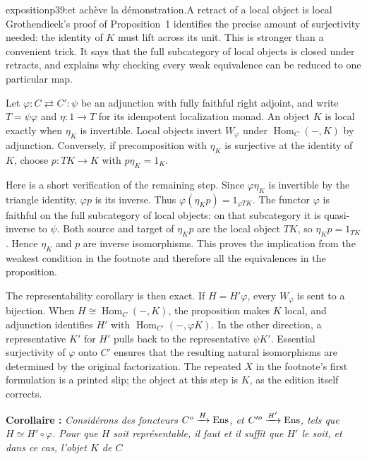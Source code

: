 \begin{dcomment}{exposition}{p39:et achève la démonstration.}{A retract of a local object is local}
Grothendieck's proof of Proposition~1 identifies the precise amount of surjectivity needed: the identity of $K$ must lift across its unit. This is stronger than a convenient trick. It says that the full subcategory of local objects is closed under retracts, and explains why checking every weak equivalence can be reduced to one particular map.

Let $\varphi:C\rightleftarrows C':\psi$ be an adjunction with fully faithful right adjoint, and write $T=\psi\varphi$ and $\eta:1\to T$ for its idempotent localization monad. An object $K$ is local exactly when $\eta_K$ is invertible. Local objects invert $W_\varphi$ under $\operatorname{Hom}_C(-,K)$ by adjunction. Conversely, if precomposition with $\eta_K$ is surjective at the identity of $K$, choose $p:TK\to K$ with $p\eta_K=1_K$.

Here is a short verification of the remaining step. Since $\varphi\eta_K$ is invertible by the triangle identity, $\varphi p$ is its inverse. Thus $\varphi(\eta_Kp)=1_{\varphi TK}$. The functor $\varphi$ is faithful on the full subcategory of local objects: on that subcategory it is quasi-inverse to $\psi$. Both source and target of $\eta_Kp$ are the local object $TK$, so $\eta_Kp=1_{TK}$. Hence $\eta_K$ and $p$ are inverse isomorphisms. This proves the implication from the weakest condition in the footnote and therefore all the equivalences in the proposition.

The representability corollary is then exact. If $H=H'\varphi$, every $W_\varphi$ is sent to a bijection. When $H\cong\operatorname{Hom}_C(-,K)$, the proposition makes $K$ local, and adjunction identifies $H'$ with $\operatorname{Hom}_{C'}(-,\varphi K)$. In the other direction, a representative $K'$ for $H'$ pulls back to the representative $\psi K'$. Essential surjectivity of $\varphi$ onto $C'$ ensures that the resulting natural isomorphisms are determined by the original factorization. The repeated $X$ in the footnote's first formulation is a printed slip; the object at this step is $K$, as the edition itself corrects.
\end{dcomment}


\textbf{Corollaire :} \textit{Considérons des foncteurs $C^o \xrightarrow{H} \mathrm{Ens}$, et $C'^o \xrightarrow{H'} \mathrm{Ens}$, tels que $H \simeq H'\circ\varphi$. Pour que $H$ soit représentable, il faut et il suffit que $H'$ le soit, et dans ce cas, l'objet $K$ de $C$}

